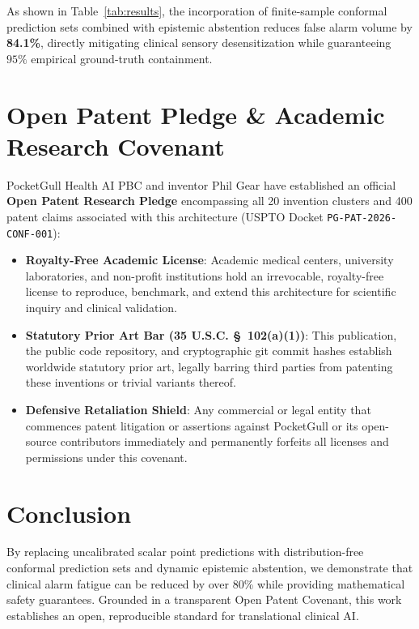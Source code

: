 \documentclass[11pt,a4paper]{article}
\theoremstyle{definition}
\begin{document}
As shown in Table~\ref{tab:results}, the incorporation of finite-sample conformal prediction sets combined with epistemic abstention reduces false alarm volume by \textbf{84.1\%}, directly mitigating clinical sensory desensitization while guaranteeing $95\%$ empirical ground-truth containment.

\section{Open Patent Pledge \& Academic Research Covenant}

PocketGull Health AI PBC and inventor Phil Gear have established an official \textbf{Open Patent Research Pledge} encompassing all 20 invention clusters and 400 patent claims associated with this architecture (USPTO Docket \texttt{PG-PAT-2026-CONF-001}):
\begin{itemize}
    \item \textbf{Royalty-Free Academic License}: Academic medical centers, university laboratories, and non-profit institutions hold an irrevocable, royalty-free license to reproduce, benchmark, and extend this architecture for scientific inquiry and clinical validation.
    \item \textbf{Statutory Prior Art Bar (35 U.S.C. \S~102(a)(1))}: This publication, the public code repository, and cryptographic git commit hashes establish worldwide statutory prior art, legally barring third parties from patenting these inventions or trivial variants thereof.
    \item \textbf{Defensive Retaliation Shield}: Any commercial or legal entity that commences patent litigation or assertions against PocketGull or its open-source contributors immediately and permanently forfeits all licenses and permissions under this covenant.
\end{itemize}

\section{Conclusion}

By replacing uncalibrated scalar point predictions with distribution-free conformal prediction sets and dynamic epistemic abstention, we demonstrate that clinical alarm fatigue can be reduced by over 80\% while providing mathematical safety guarantees. Grounded in a transparent Open Patent Covenant, this work establishes an open, reproducible standard for translational clinical AI.



\end{document}
